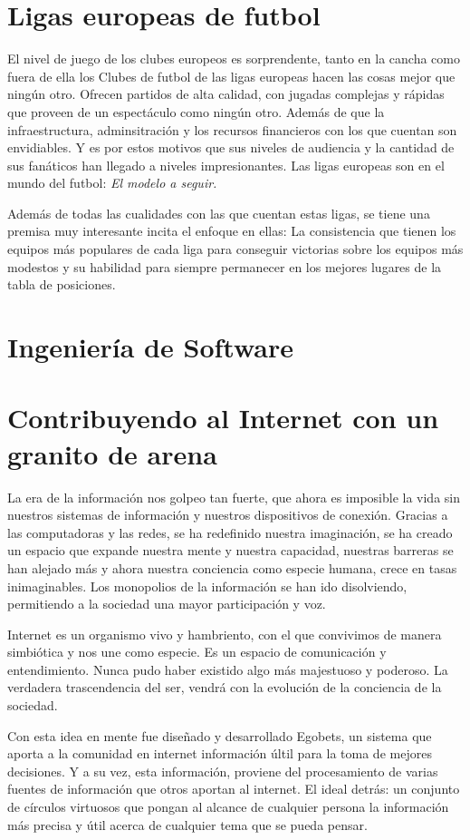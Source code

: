  \section{Ligas europeas de futbol}
El nivel de juego de los clubes europeos es sorprendente, tanto en la cancha como fuera de ella los Clubes de futbol de las ligas europeas hacen las cosas mejor que ningún otro. Ofrecen partidos de alta calidad, con jugadas complejas y rápidas que proveen de un espectáculo como ningún otro. Además de que la infraestructura, adminsitración y los recursos financieros con los que cuentan son envidiables. Y es por estos motivos que sus niveles de audiencia y la cantidad de sus fanáticos han llegado a niveles impresionantes. Las ligas europeas son en el mundo del futbol: \emph{El modelo a seguir.}



Además de todas las cualidades con las que cuentan estas ligas, se tiene una premisa muy interesante incita el enfoque en ellas: La consistencia que tienen los equipos más populares de cada liga para conseguir victorias sobre los equipos más modestos y su habilidad para siempre permanecer en los mejores lugares de la tabla de posiciones. 

\section{Ingeniería de Software}
 \section{Contribuyendo al Internet con un granito de arena}
La era de la información nos golpeo tan fuerte, que ahora es imposible la vida sin nuestros sistemas de información y nuestros dispositivos de conexión. Gracias a las computadoras y las redes, se ha redefinido nuestra imaginación, se ha creado un espacio que expande nuestra mente y nuestra capacidad, nuestras barreras se han alejado más y ahora nuestra conciencia como especie humana, crece en tasas inimaginables. Los monopolios de la información se han ido disolviendo, permitiendo a la sociedad una mayor participación y voz.

Internet es un organismo vivo y hambriento, con el que convivimos de manera simbiótica y nos une como especie. Es un espacio de comunicación y entendimiento. Nunca pudo haber existido algo más majestuoso y poderoso. La verdadera trascendencia del ser, vendrá con la evolución de la conciencia de la sociedad.

Con esta idea en mente fue diseñado y desarrollado Egobets, un sistema que aporta a la comunidad en internet información últil para la toma de mejores decisiones. Y a su vez, esta información, proviene del procesamiento de varias fuentes de información que otros aportan al internet. El ideal detrás: un conjunto de círculos virtuosos que pongan al alcance de cualquier persona la información más precisa y útil acerca de cualquier tema que se pueda pensar.

